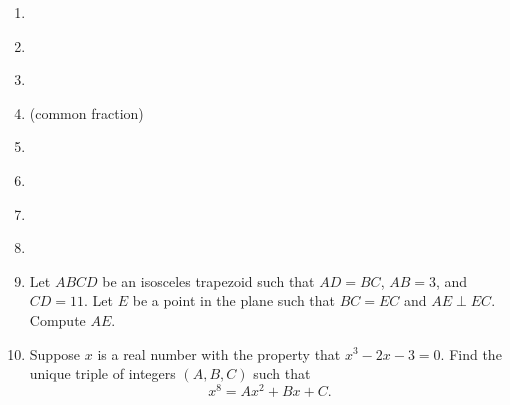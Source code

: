 \documentclass{article}
\begin{document}
\begin{enumerate}
\item \underline{\hspace{3in}}\vspace{1cm}
\item \underline{\hspace{3in}}\vspace{1cm}
\item \underline{\hspace{3in}}\vspace{1cm}
\item \underline{\hspace{3in}} (common fraction)\vspace{1cm}
\item \underline{\hspace{3in}}\vspace{1cm}
\item \underline{\hspace{3in}}\vspace{1cm}
\item \underline{\hspace{3in}}\vspace{1cm}
\item \underline{\hspace{3in}}\vspace{1cm}
\item Let $ABCD$ be an isosceles trapezoid such that $AD = BC$, $AB = 3$, and $CD = 11$. Let $E$ be a point in the plane such that $BC = EC$ and $AE\perp EC$. Compute $AE$.
\vspace{1cm}
\item Suppose $x$ is a real number with the property that $x^3 - 2x - 3 = 0$. Find the unique triple of integers $(A,B,C)$ such that
\begin{equation*}
x^8 = Ax^2 + Bx + C.
\end{equation*}
\end{enumerate}


\newpage
\end{document}
